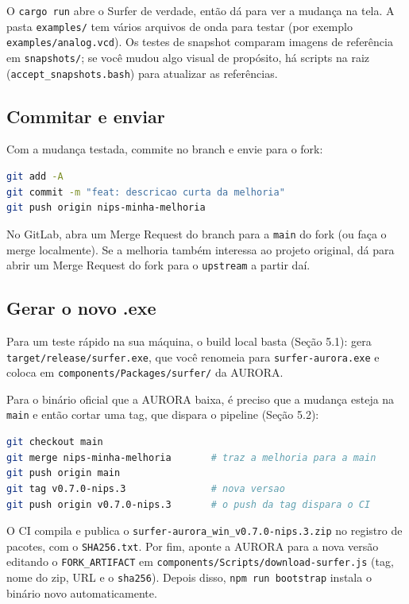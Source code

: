 \documentclass[11pt,a4paper]{article}
\begin{document}
O \texttt{cargo run} abre o Surfer de verdade, então dá para ver a mudança na
tela. A pasta \texttt{examples/} tem vários arquivos de onda para testar (por
exemplo \texttt{examples/analog.vcd}). Os testes de snapshot comparam imagens de
referência em \texttt{snapshots/}; se você mudou algo visual de propósito, há
scripts na raiz (\texttt{accept\_snapshots.bash}) para atualizar as referências.

\subsection{Commitar e enviar}

Com a mudança testada, commite no branch e envie para o fork:

\begin{lstlisting}[language=bash]
git add -A
git commit -m "feat: descricao curta da melhoria"
git push origin nips-minha-melhoria
\end{lstlisting}

No GitLab, abra um Merge Request do branch para a \texttt{main} do fork (ou faça
o merge localmente). Se a melhoria também interessa ao projeto original, dá para
abrir um Merge Request do fork para o \texttt{upstream} a partir daí.

\subsection{Gerar o novo .exe}

Para um teste rápido na sua máquina, o build local basta (Seção 5.1): gera
\texttt{target/release/surfer.exe}, que você renomeia para
\texttt{surfer-aurora.exe} e coloca em \texttt{components/Packages/surfer/} da
AURORA.

Para o binário oficial que a AURORA baixa, é preciso que a mudança esteja na
\texttt{main} e então cortar uma tag, que dispara o pipeline (Seção 5.2):

\begin{lstlisting}[language=bash]
git checkout main
git merge nips-minha-melhoria       # traz a melhoria para a main
git push origin main
git tag v0.7.0-nips.3               # nova versao
git push origin v0.7.0-nips.3       # o push da tag dispara o CI
\end{lstlisting}

O CI compila e publica o \texttt{surfer-aurora\_win\_v0.7.0-nips.3.zip} no
registro de pacotes, com o \texttt{SHA256.txt}. Por fim, aponte a AURORA para a
nova versão editando o \texttt{FORK\_ARTIFACT} em
\texttt{components/Scripts/download-surfer.js} (tag, nome do zip, URL e o
\texttt{sha256}). Depois disso, \texttt{npm run bootstrap} instala o binário novo
automaticamente.
\end{document}
